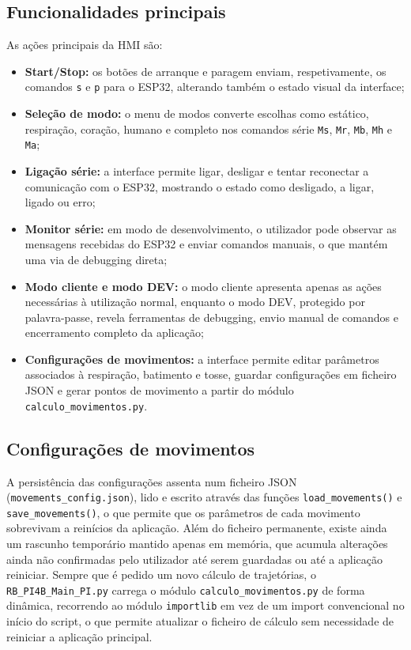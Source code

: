 \subsection{Funcionalidades principais}
As ações principais da HMI são:
\begin{itemize}
  \item \textbf{Start/Stop:} os botões de arranque e paragem enviam, respetivamente, os comandos \texttt{s} e \texttt{p} para o ESP32, alterando também o estado visual da interface;
  \item \textbf{Seleção de modo:} o menu de modos converte escolhas como estático, respiração, coração, humano e completo nos comandos série \texttt{Ms}, \texttt{Mr}, \texttt{Mb}, \texttt{Mh} e \texttt{Ma};
  \item \textbf{Ligação série:} a interface permite ligar, desligar e tentar reconectar a comunicação com o ESP32, mostrando o estado como desligado, a ligar, ligado ou erro;
  \item \textbf{Monitor série:} em modo de desenvolvimento, o utilizador pode observar as mensagens recebidas do ESP32 e enviar comandos manuais, o que mantém uma via de debugging direta;
  \item \textbf{Modo cliente e modo DEV:} o modo cliente apresenta apenas as ações necessárias à utilização normal, enquanto o modo DEV, protegido por palavra-passe, revela ferramentas de debugging, envio manual de comandos e encerramento completo da aplicação;
  \item \textbf{Configurações de movimentos:} a interface permite editar parâmetros associados à respiração, batimento e tosse, guardar configurações em ficheiro JSON e gerar pontos de movimento a partir do módulo \texttt{calculo\_movimentos.py}.
\end{itemize}

\subsection{Configurações de movimentos}
A persistência das configurações assenta num ficheiro JSON (\texttt{movements\_config.json}), lido e escrito através das funções \texttt{load\_movements()} e \texttt{save\_movements()}, o que permite que os parâmetros de cada movimento sobrevivam a reinícios da aplicação. Além do ficheiro permanente, existe ainda um rascunho temporário mantido apenas em memória, que acumula alterações ainda não confirmadas pelo utilizador até serem guardadas ou até a aplicação reiniciar. Sempre que é pedido um novo cálculo de trajetórias, o \texttt{RB\_PI4B\_Main\_PI.py} carrega o módulo \texttt{calculo\_movimentos.py} de forma dinâmica, recorrendo ao módulo \texttt{importlib} em vez de um import convencional no início do script, o que permite atualizar o ficheiro de cálculo sem necessidade de reiniciar a aplicação principal.

